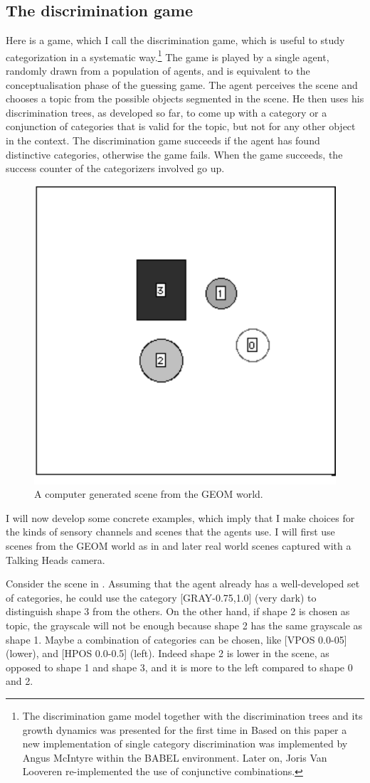\subsection{The discrimination game} 

Here is a game, which I call the discrimination game, which is useful 
to study categorization in 
a systematic way.\footnote{
The discrimination game model together with the 
discrimination trees and its growth dynamics 
was presented for the first time in \cite{Steels:1996}
Based on this paper a new implementation of
single category discrimination was implemented by Angus McIntyre 
within the BABEL environment. Later on, Joris Van Looveren
re-implemented the use of conjunctive combinations.}
The game is played by a single agent, randomly 
drawn from a population of agents, and 
is equivalent to the conceptualisation phase of 
the guessing game. The agent perceives the scene and 
chooses a topic from the possible objects segmented in the
scene. He then uses his discrimination trees, as developed so
far, to come up with a category or a conjunction
of categories that is valid for the topic, but not for any
other object in the context. The discrimination game succeeds if 
the agent has found distinctive categories, otherwise the game
fails. When the game succeeds, the success counter
of the categorizers involved go up. 

\begin{figure}[htbp]
  \centerline{\includegraphics[width=.40\textwidth]{chap4/figs/game5}}
\caption{\footnotesize \label{geom} A computer generated scene 
from the GEOM world.}
\end{figure}

I will now develop some concrete examples, which imply
that I make choices for the kinds of sensory channels
and scenes that the agents use. 
I will first use scenes from the GEOM world as in 
 and later real world scenes captured
with a Talking Heads camera. 

Consider the scene in . Assuming that the agent
already has a well-developed set of categories, he could use 
the category [GRAY-0.75,1.0] (very dark) to distinguish 
shape 3 from the others. On the other hand, if shape 2 is 
chosen as topic, the grayscale will not be enough because
shape 2 has the same grayscale as shape 1. Maybe a 
combination of categories can be chosen, like [VPOS 0.0-05]
(lower), and [HPOS 0.0-0.5] (left). Indeed shape 2
is lower in the scene, as opposed to
shape 1 and shape 3, and it is more to the left compared 
to shape 0 and 2.

